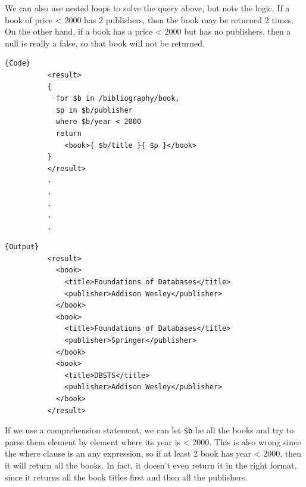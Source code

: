 \documentclass{article}
\begin{document}
    \begin{example}
      We can also use nested loops to solve the query above, but note the logic. If a book of price < 2000 has 2 publishers, then the book may be returned 2 times. On the other hand, if a book has a price < 2000 but has no publishers, then a null is really a false, so that book will not be returned. 

      \noindent\begin{minipage}{.5\textwidth}
        \begin{lstlisting}[]{Code}
          <result>
          {
            for $b in /bibliography/book,
            $p in $b/publisher
            where $b/year < 2000
            return 
              <book>{ $b/title }{ $p }</book>
          }
          </result> 
          .
          .
          .
          .
          .
        \end{lstlisting}
        \end{minipage}
        \hfill
        \begin{minipage}{.49\textwidth}
        \begin{lstlisting}[]{Output}
          <result>
            <book>
              <title>Foundations of Databases</title>
              <publisher>Addison Wesley</publisher>
            </book>
            <book>
              <title>Foundations of Databases</title>
              <publisher>Springer</publisher>
            </book>
            <book>
              <title>DBSTS</title>
              <publisher>Addison Wesley</publisher>
            </book>
          </result>          
        \end{lstlisting}
      \end{minipage}

      If we use a comprehension statement, we can let \texttt{\$b} be all the books and try to parse them element by element where its year is < 2000. This is also wrong since the where clause is an any expression, so if at least 2 book has year < 2000, then it will return all the books. In fact, it doesn't even return it in the right format, since it returns all the book titles first and then all the publishers. 


\end{example}
\end{document}
